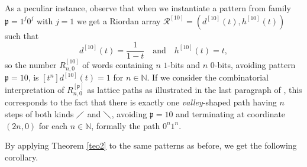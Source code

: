 As a peculiar instance, observe that when we instantiate a pattern from family
$\mathfrak{p}=1^{j}0^{j}$ with $j=1$ we get a Riordan array
${\mathcal{R}^{[10]}} = \left(d^{[10]}(t), h^{[10]}(t)\right)$ such that
\begin{displaymath} d^{[10]}(t)=\frac{1}{1-t} \quad \text{and} \quad
h^{[10]}(t) = t, \end{displaymath} so the number $R_{n, 0}^{[10]}$ of words
containing $n$ $1$-bits  and $n$ $0$-bits, avoiding pattern $\mathfrak{p}=10$, is
$[t^{n}] d^{[10]}(t) = 1$ for $n\in\mathbb{N}$. If we consider the
combinatorial interpretation of $R_{n,0}^{[\mathfrak{p}]}$ as lattice paths as
illustrated in the last paragraph of , this
corresponds to the fact that there is exactly one \emph{valley}-shaped path having $n$ steps of both
kinds $\diagup$ and $\diagdown$, avoiding $\mathfrak{p}=10$ and terminating at
coordinate $(2n, 0)$ for each $n\in\mathbb{N}$, formally the path $0^{n}1^{n}$.

By applying Theorem \ref{teo2} to the same patterns as before, we get the following corollary.

